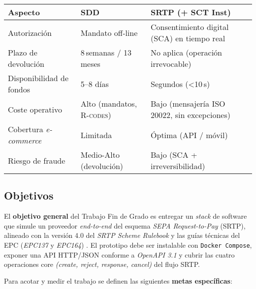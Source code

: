 \renewcommand{\arraystretch}{1.3}
\begin{tabular}{@{}p{4.5cm}p{4.1cm}p{4.1cm}@{}}
\toprule
\textbf{Aspecto} & \textbf{SDD} & \textbf{SRTP (+ SCT Inst)} \\ \midrule
Autorización & Mandato off-line & Consentimiento digital (\textsc{SCA}) en tiempo real \\ 
Plazo de devolución & 8\,semanas / 13\,meses & No aplica (operación irrevocable) \\ 
Disponibilidad de fondos & 5–8 días & Segundos (\textless10\,s) \\ 
Coste operativo & Alto (mandatos, \textsc{R-codes}) & Bajo (mensajería ISO 20022, sin excepciones) \\ 
Cobertura \emph{e-commerce} & Limitada & Óptima (API / móvil) \\ 
Riesgo de fraude & Medio-Alto (devolución) & Bajo (\textsc{SCA} + irreversibilidad) \\ 
\bottomrule
\end{tabular}



\subsection{Objetivos}
\label{subsec:Objetivos}
El \textbf{objetivo general} del Trabajo Fin de Grado es entregar un \textit{stack} de software que
simule un proveedor \emph{end-to-end} del esquema \emph{SEPA Request-to-Pay} (SRTP),
alineado con la versión 4.0 del \emph{SRTP Scheme Rulebook} \cite{epc014} y las
guías técnicas del EPC (\emph{EPC137} y \emph{EPC164}) \cite{epc137,epc164}.  
El prototipo debe ser instalable con \texttt{Docker Compose}, exponer una API
HTTP/JSON conforme a \emph{OpenAPI 3.1} y cubrir las cuatro operaciones
core \emph{(create, reject, response, cancel)} del flujo SRTP.

\noindent Para acotar y medir el trabajo se definen las siguientes \textbf{metas
específicas}:

